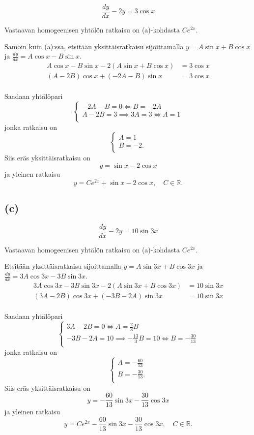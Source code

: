 \documentclass{article}
\begin{document}
\[
  \frac{dy}{dx} - 2y = 3 \cos x
\]

Vastaavan homogeenisen yhtälön ratkaisu on (a)-kohdasta $Ce^{2x}$.

Samoin kuin (a):ssa, etsitään yksittäisratkaisu sijoittamalla $y = A \sin x + B
\cos x$ ja $\frac{dy}{dx} = A \cos x - B \sin x$.
\begin{align*}
  A \cos x - B \sin x - 2(A \sin x + B \cos x) &= 3 \cos x \\
  (A - 2B) \cos x + (-2A - B) \sin x &= 3 \cos x \\
\end{align*}

Saadaan yhtälöpari
\[
  \begin{cases}
    -2A - B = 0 \iff B = -2A \\
    A - 2B = 3 \implies 3A = 3 \iff A = 1 \\
  \end{cases}
\]
jonka ratkaisu on
\[
  \begin{cases}
    A = 1 \\
    B = -2. \\
  \end{cases}
\]
Siis eräs yksittäisratkaisu on
\[
  y = \sin x - 2 \cos x
\]
ja yleinen ratkaisu
\[
  y = Ce^{2x} + \sin x - 2 \cos x, \quad C \in \mathbb{R}.
\]

\subsection*{(c)}

\[
  \frac{dy}{dx} - 2y = 10 \sin 3x
\]

Vastaavan homogeenisen yhtälön ratkaisu on (a)-kohdasta $Ce^{2x}$.

Etsitään yksittäisratkaisu sijoittamalla $y = A \sin 3x + B \cos 3x$ ja
$\frac{dy}{dx} = 3A \cos 3x - 3B \sin 3x$.
\begin{align*}
  3A \cos 3x - 3B \sin 3x - 2(A \sin 3x + B \cos 3x) &= 10 \sin 3x \\
  (3A - 2B) \cos 3x + (-3B - 2A) \sin 3x &= 10 \sin 3x \\
\end{align*}

Saadaan yhtälöpari
\[
  \begin{cases}
    3A - 2B = 0 \iff A = \frac{2}{3}B \\
    -3B - 2A = 10 \implies -\frac{13}{3}B = 10 \iff B = -\frac{30}{13} \\
  \end{cases}
\]
jonka ratkaisu on
\[
  \begin{cases}
    A = -\frac{60}{13} \\
    B = -\frac{30}{13}. \\
  \end{cases}
\]
Siis eräs yksittäisratkaisu on
\[
  y = -\frac{60}{13} \sin 3x - \frac{30}{13} \cos 3x
\]
ja yleinen ratkaisu
\[
  y = Ce^{2x} - \frac{60}{13} \sin 3x - \frac{30}{13} \cos 3x, \quad C \in \mathbb{R}.
\]
\end{document}
